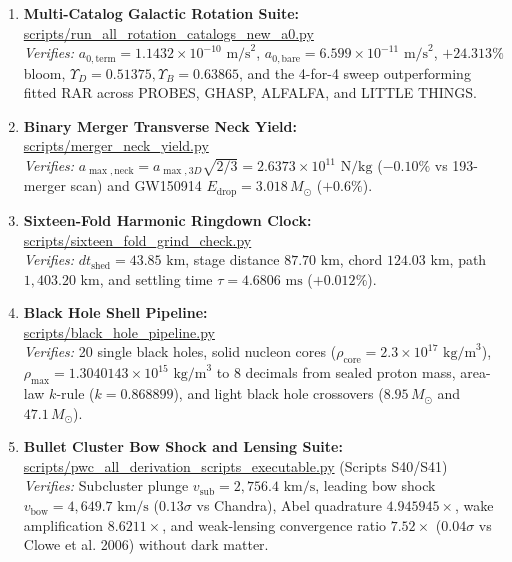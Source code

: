 \documentclass[11pt,a4paper]{article}
\begin{document}
\begin{enumerate}
    \item \textbf{Multi-Catalog Galactic Rotation Suite:}\\
    \url{scripts/run_all_rotation_catalogs_new_a0.py}\\
    \textit{Verifies:} $a_{0,\text{term}} = 1.1432 \times 10^{-10}\text{ m/s}^2$, $a_{0,\text{bare}} = 6.599 \times 10^{-11}\text{ m/s}^2$, $+24.313\%$ bloom, $\Upsilon_D = 0.51375, \Upsilon_B = 0.63865$, and the 4-for-4 sweep outperforming fitted RAR across PROBES, GHASP, ALFALFA, and LITTLE THINGS.

    \item \textbf{Binary Merger Transverse Neck Yield:}\\
    \url{scripts/merger_neck_yield.py}\\
    \textit{Verifies:} $a_{\max,\text{neck}} = a_{\max,3D}\sqrt{2/3} = 2.6373 \times 10^{11}\text{ N/kg}$ ($-0.10\%$ vs 193-merger scan) and GW150914 $E_{\text{drop}} = 3.018\,M_\odot$ ($+0.6\%$).

    \item \textbf{Sixteen-Fold Harmonic Ringdown Clock:}\\
    \url{scripts/sixteen_fold_grind_check.py}\\
    \textit{Verifies:} $dt_{\text{shed}} = 43.85\text{ km}$, stage distance $87.70\text{ km}$, chord $124.03\text{ km}$, path $1,403.20\text{ km}$, and settling time $\tau = 4.6806\text{ ms}$ ($+0.012\%$).

    \item \textbf{Black Hole Shell Pipeline:}\\
    \url{scripts/black_hole_pipeline.py}\\
    \textit{Verifies:} 20 single black holes, solid nucleon cores ($\rho_{\text{core}} = 2.3 \times 10^{17}\text{ kg/m}^3$), $\rho_{\max} = 1.3040143 \times 10^{15}\text{ kg/m}^3$ to 8 decimals from sealed proton mass, area-law $k$-rule ($k = 0.868899$), and light black hole crossovers ($8.95\,M_\odot$ and $47.1\,M_\odot$).

    \item \textbf{Bullet Cluster Bow Shock and Lensing Suite:}\\
    \url{scripts/pwc_all_derivation_scripts_executable.py} (Scripts S40/S41)\\
    \textit{Verifies:} Subcluster plunge $v_{\text{sub}} = 2,756.4\text{ km/s}$, leading bow shock $v_{\text{bow}} = 4,649.7\text{ km/s}$ ($0.13\sigma$ vs Chandra), Abel quadrature $4.945945\times$, wake amplification $8.6211\times$, and weak-lensing convergence ratio $7.52\times$ ($0.04\sigma$ vs Clowe et al. 2006) without dark matter.
\end{enumerate}
\end{document}
